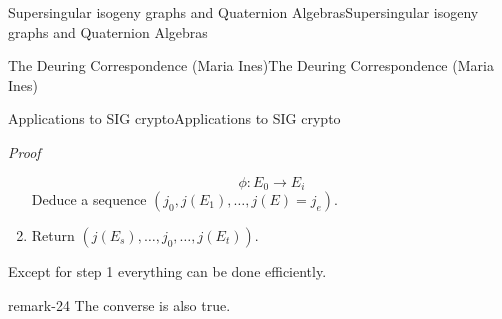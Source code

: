 \documentclass[10pt,]{book}
\makeatletter
\renewcommand*{\proofname}{Proof}
\renewenvironment{proof}[1][\proofname]{\par
  \pushQED{\qed}%
  \normalfont \topsep6\p@\@plus6\p@\relax
  \trivlist
  \item\relax
    {\itshape
    #1\@addpunct{.}}\hspace\labelsep\ignorespaces
}{%
  \popQED\endtrivlist\@endpefalse
}
\numberwithin{equation}{section}
\makeatother
\begin{document}
\begin{chapterptx}{Supersingular isogeny graphs and Quaternion Algebras}{}{Supersingular isogeny graphs and Quaternion Algebras}{}{}
\begin{sectionptx}{The Deuring Correspondence (Maria Ines)}{}{The Deuring Correspondence (Maria Ines)}{}{}
\begin{subsectionptx}{Applications to SIG crypto}{}{Applications to SIG crypto}{}{}
\begin{proof}
\begin{enumerate}
\begin{equation*}
\phi\colon E_0 \to E_i
\end{equation*}
Deduce a sequence \((j_0, j(E_1),\ldots,j(E) = j_e)\).%
\item\hypertarget{li-248}{}Return \((j(E_s), \ldots,j_0, \ldots,j(E_t))\).%
\end{enumerate}
%
\par
\hypertarget{p-982}{}%
Except for step 1 everything can be done efficiently.%
\end{proof}
\begin{remark}{}{remark-24}%
\hypertarget{p-983}{}%
The converse is also true.%
\end{remark}
\end{subsectionptx}
\end{sectionptx}
\end{chapterptx}
%
%
\typeout{************************************************}
\typeout{************************************************}
%
\end{document}
